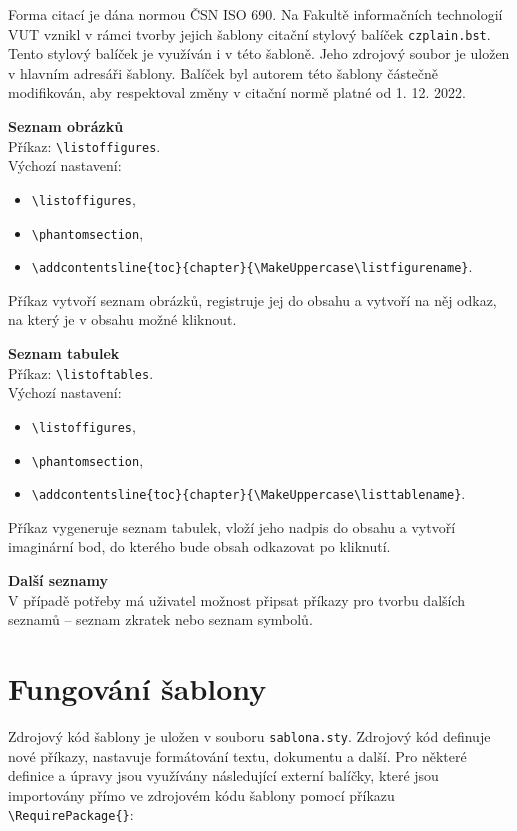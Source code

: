 Forma citací je dána normou ČSN ISO 690. Na Fakultě informačních technologií VUT vznikl v rámci tvorby jejich šablony citační stylový balíček \verb|czplain.bst|. Tento stylový balíček je využíván i v této šabloně. Jeho zdrojový soubor je uložen v hlavním adresáři šablony. Balíček byl autorem této šablony částečně modifikován, aby respektoval změny v citační normě platné od 1. 12. 2022.

\vspace{8pt}

\textbf{Seznam obrázků}\\
Příkaz: \verb|\listoffigures|.\\
Výchozí nastavení:

\begin{itemize}[label={-}]
	\item \verb|\listoffigures|,
	\item \verb|\phantomsection|,
	\item \verb|\addcontentsline{toc}{chapter}{\MakeUppercase\listfigurename}|.
\end{itemize}

Příkaz vytvoří seznam obrázků, registruje jej do obsahu a vytvoří na něj odkaz, na který je v obsahu možné kliknout.

\vspace{8pt}

\textbf{Seznam tabulek}\\
Příkaz: \verb|\listoftables|.\\
Výchozí nastavení:

\begin{itemize}[label={-}]
	\item \verb|\listoffigures|,
	\item \verb|\phantomsection|,
	\item \verb|\addcontentsline{toc}{chapter}{\MakeUppercase\listtablename}|.
\end{itemize}

Příkaz vygeneruje seznam tabulek, vloží jeho nadpis do obsahu a vytvoří imaginární bod, do kterého bude obsah odkazovat po kliknutí.

\vspace{8pt}

\textbf{Další seznamy}\\
V případě potřeby má uživatel možnost připsat příkazy pro tvorbu dalších seznamů -- seznam zkratek nebo seznam symbolů.


\section{Fungování šablony}
Zdrojový kód šablony je uložen v souboru \verb|sablona.sty|. Zdrojový kód definuje nové příkazy, nastavuje formátování textu, dokumentu a další. Pro některé definice a úpravy jsou využívány následující externí balíčky, které jsou importovány přímo ve zdrojovém kódu šablony pomocí příkazu \verb|\RequirePackage{}|:

